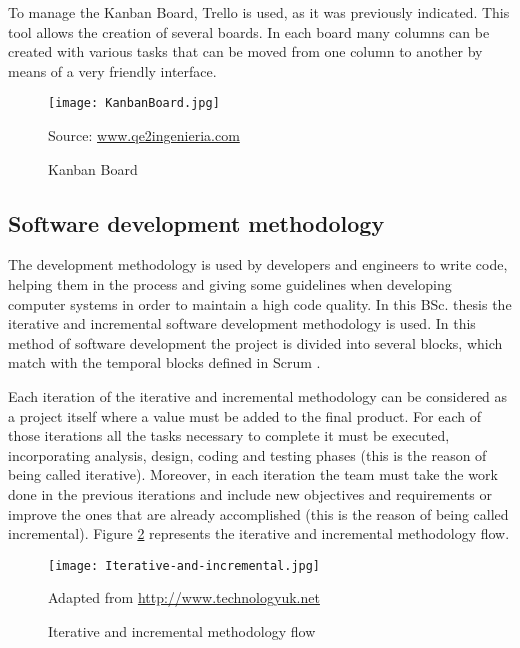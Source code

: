\documentclass{pre-tfg}
\begin{document}
To manage the Kanban Board, Trello is used, as it was previously indicated. This tool allows the creation of several boards. In each board many columns can be created with various tasks that can be moved from one column to another by means of a very friendly interface.

\begin{figure}[!h]
	\begin{center}
		\texttt{[image: KanbanBoard.jpg]}
		\caption{Kanban Board}
		\label{fig:5-KanbanBoard}{Source: \url{www.qe2ingenieria.com}}
	\end{center}
\end{figure}

\subsection{Software development methodology}
The development methodology is used by developers and engineers to write code, helping them in the process and giving some guidelines when developing computer systems in order to maintain a high code quality. In this BSc. thesis the iterative and incremental software development methodology is used. In this method of software development the project is divided into several blocks, which match with the temporal blocks defined in Scrum \cite{ItIncr}. 

Each iteration of the iterative and incremental methodology can be considered as a project itself where a value must be added to the final product. For each of those iterations all the tasks necessary to complete it must be executed, incorporating analysis, design, coding and testing phases (this is the reason of being called iterative). Moreover, in each iteration the team must take the work done in the previous iterations and include new objectives and requirements or improve the ones that are already accomplished (this is the reason of being called incremental). Figure \ref{fig:5-Iterative-and-incremental} represents the iterative and incremental methodology flow.

\begin{figure}[!h]
	\begin{center}
		\texttt{[image: Iterative-and-incremental.jpg]}
		\caption{Iterative and incremental methodology flow}
		\label{fig:5-Iterative-and-incremental}{Adapted from  \url{http://www.technologyuk.net}}
	\end{center}
\end{figure}
\end{document}
